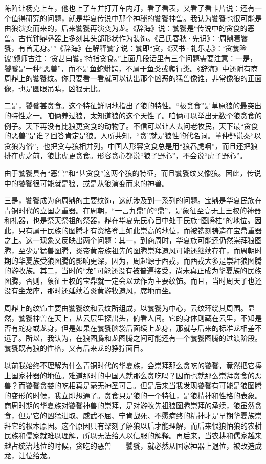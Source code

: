 \par 
\par 陈阵让杨克上车，他也上了车并打开车内灯，看了看表，又看了看卡片说：还有一个值得研究的问题，就是华夏传说中那个神秘的饕餮神兽。我认为饕餮也很可能是由狼演变而来的，后来饕餮再演变为龙。《辞海》说：饕餮是“传说中的贪食的恶兽。古代钟鼎彝器上多刻其头部形状作为装饰。《吕氏春秋·先识》：‘周鼎着饕餮，有首无身。’”《辞海》在解释饕字说：饕即“贪，《汉书·礼乐志》：‘贪饕险诐’颜师古注：‘贪甚曰饕。’特指贪食。”上面几段话里有三个问题需要注意：一是，饕餮是一种“恶兽”，而不是鱼蛇蟒鳄，不属于鱼类或爬行类。《辞海》中还附有商周鼎上的饕餮纹。你只要看一看就可以认出那个凶恶的猛兽像谁，非常像狼的正面像，也是圆眼吊睛，凶狠无比。
\par 二是，饕餮甚贪食。这个特征鲜明地指出了狼的特性。“极贪食”是草原狼的最突出的特性之一。咱俩养过狼，太知道狼的这个天性了。咱俩可以举出无数个狼贪食的例子。天下再没有比狼更贪食的动物了。不信可以让人去问老牧民，天下最“贪食的恶兽”是谁？回答肯定是狼。人所共知，“贪”就是狼性的代名词。董仲舒说秦“以贪狼为俗”，也把贪与狼相并列。中国人形容贪食总是用“狼吞虎咽”，而且还把狼排在虎之前，狼比虎更贪食。形容贪心都说“狼子野心”，不会说“虎子野心”。
\par 由于饕餮具有“恶兽”和“甚贪食”这两个狼的特征，而且饕餮纹又像狼。因此，传说中的饕餮很可能就是狼，或是从狼演变而来的神兽。
\par 三是，饕餮成为商周鼎的主要纹饰，这就涉及到一系列的问题。宝鼎是华夏民族在青铜时代的立国之重器。在周朝，“一言九鼎”的“鼎”，是象征至高无上王权的神器和礼器，也是祭天祭祖的祭器，鼎在华夏先民心目中处于民族“图腾柱”的地位。因此，只有属于民族的图腾才有资格登上如此崇高的地位，而被镌刻铸造在宝鼎重器之上。这一现象又反映出两个问题：其一，到商周时，华夏族可能还仍然崇拜狼图腾，至少是猛兽图腾，炎帝黄帝族祖先的图腾崇拜遗风可能还继续存在，而周朝时期的华夏族受狼图腾的影响更深，因为，周起源于西戎，而西戎大多是崇拜狼图腾的游牧族。其二，当时的“龙”可能还没有被普遍接受，尚未真正成为华夏族的民族图腾，否则，象征王权的宝鼎就一定会以龙作为主要纹饰。而且，当时周天子也还没有坐龙座，那时还延续着炎黄游牧遗风，席地而坐。
\par 周鼎上的纹饰主要由饕餮纹和云纹所组成，以饕餮为中心，云纹环绕其周围。显然，饕餮神兽在天上，从云层里探出头，俯看人间。它的身体则藏在云里，不知是否有蛇身或龙身，但是如果在饕餮脑袋后面续上龙身，那就与后来的标准龙相差不远了。所以，我认为，在狼图腾和龙图腾之间可能还有一个饕餮图腾的过渡阶段。饕餮既有狼的性格，又有后来龙的狰狞面目。
\par 以前我始终不理解为什么青铜时代的华夏族，会崇拜那么贪吃的饕餮，竟然把它捧上国家神器的地位。难道那时的中国人就那么贪吃吗？因而也就那么崇拜贪食的恶兽？而饕餮贪婪的吃相真是毫无神圣可言。但是后来当我发现饕餮有可能是狼图腾的变形的时候，我立即想通了。贪食只是狼的一个特征，是狼精神和性格的表象。商周时期的华夏族对饕餮神兽的崇拜，是对游牧先祖狼图腾崇拜的承续，狼虽然贪食，但是它的凶猛进取、威武不屈、宁肯战死、不愿病终的精神才是早期华夏族崇拜它的根本原因。这个原因只有深刻了解狼以后才能理解，而后来恨狼怕狼的农耕民族和儒家就难以理解，所以无法给人以信服的解释。再后来，当农耕和儒家越来越占统治地位的时候，贪吃的恶兽——饕餮，就必然从国家神器上退位，被改造成龙，让位给龙。
